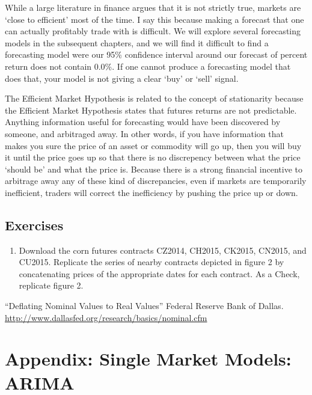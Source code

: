 \documentclass[
]{book}
\providecommand{\tightlist}{%
  \setlength{\itemsep}{0pt}\setlength{\parskip}{0pt}}
\begin{document}
While a large literature in finance argues that it is not strictly true, markets are `close to efficient' most of the time. I say this because making a forecast that one can actually profitably trade with is difficult. We will explore several forecasting models in the subsequent chapters, and we will find it difficult to find a forecasting model were our 95\% confidence interval around our forecast of percent return does not contain 0.0\%. If one cannot produce a forecasting model that does that, your model is not giving a clear `buy' or `sell' signal.

The Efficient Market Hypothesis is related to the concept of stationarity because the Efficient Market Hypothesis states that futures returns are not predictable. Anything information useful for forecasting would have been discovered by someone, and arbitraged away. In other words, if you have information that makes you sure the price of an asset or commodity will go up, then you will buy it until the price goes up so that there is no discrepency between what the price `should be' and what the price is. Because there is a strong financial incentive to arbitrage away any of these kind of discrepancies, even if markets are temporarily inefficient, traders will correct the inefficiency by pushing the price up or down.

\hypertarget{exercises-11}{%
\section{Exercises}\label{exercises-11}}

\begin{enumerate}
\def\labelenumi{\arabic{enumi}.}
\tightlist
\item
  Download the corn futures contracts CZ2014, CH2015, CK2015, CN2015, and CU2015. Replicate the series of nearby contracts depicted in figure 2 by concatenating prices of the appropriate dates for each contract. As a Check, replicate figure 2.
\end{enumerate}

``Deflating Nominal Values to Real Values'' Federal Reserve Bank of Dallas. \url{http://www.dallasfed.org/research/basics/nominal.cfm}

\hypertarget{appendix-single-market-models-arima}{%
\chapter{Appendix: Single Market Models: ARIMA}\label{appendix-single-market-models-arima}}
\end{document}
